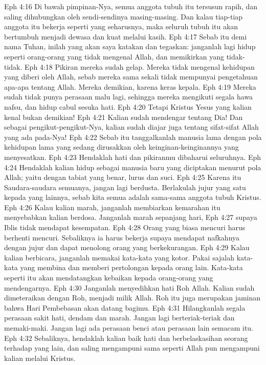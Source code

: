 Eph 4:16  Di bawah pimpinan-Nya, semua anggota tubuh itu tersusun rapih, dan saling dihubungkan oleh sendi-sendinya masing-masing. Dan kalau tiap-tiap anggota itu bekerja seperti yang seharusnya, maka seluruh tubuh itu akan bertumbuh menjadi dewasa dan kuat melalui kasih.
Eph 4:17  Sebab itu demi nama Tuhan, inilah yang akan saya katakan dan tegaskan: janganlah lagi hidup seperti orang-orang yang tidak mengenal Allah, dan memikirkan yang tidak-tidak.
Eph 4:18  Pikiran mereka sudah gelap. Mereka tidak mengenal kehidupan yang diberi oleh Allah, sebab mereka sama sekali tidak mempunyai pengetahuan apa-apa tentang Allah. Mereka demikian, karena keras kepala.
Eph 4:19  Mereka sudah tidak punya perasaan malu lagi, sehingga mereka mengikuti segala hawa nafsu, dan hidup cabul sesuka hati.
Eph 4:20  Tetapi Kristus Yesus yang kalian kenal bukan demikian!
Eph 4:21  Kalian sudah mendengar tentang Dia! Dan sebagai pengikut-pengikut-Nya, kalian sudah diajar juga tentang sifat-sifat Allah yang ada pada-Nya!
Eph 4:22  Sebab itu tanggalkanlah manusia lama dengan pola kehidupan lama yang sedang dirusakkan oleh keinginan-keinginannya yang menyesatkan.
Eph 4:23  Hendaklah hati dan pikiranmu dibaharui seluruhnya.
Eph 4:24  Hendaklah kalian hidup sebagai manusia baru yang diciptakan menurut pola Allah; yaitu dengan tabiat yang benar, lurus dan suci.
Eph 4:25  Karena itu Saudara-saudara semuanya, jangan lagi berdusta. Berlakulah jujur yang satu kepada yang lainnya, sebab kita semua adalah sama-sama anggota tubuh Kristus.
Eph 4:26  Kalau kalian marah, janganlah membiarkan kemarahan itu menyebabkan kalian berdosa. Janganlah marah sepanjang hari,
Eph 4:27  supaya Iblis tidak mendapat kesempatan.
Eph 4:28  Orang yang biasa mencuri harus berhenti mencuri. Sebaliknya ia harus bekerja supaya mendapat nafkahnya dengan jujur dan dapat menolong orang yang berkekurangan.
Eph 4:29  Kalau kalian berbicara, janganlah memakai kata-kata yang kotor. Pakai sajalah kata-kata yang membina dan memberi pertolongan kepada orang lain. Kata-kata seperti itu akan mendatangkan kebaikan kepada orang-orang yang mendengarnya.
Eph 4:30  Janganlah menyedihkan hati Roh Allah. Kalian sudah dimeteraikan dengan Roh, menjadi milik Allah. Roh itu juga merupakan jaminan bahwa Hari Pembebasan akan datang bagimu.
Eph 4:31  Hilangkanlah segala perasaan sakit hati, dendam dan marah. Jangan lagi berteriak-teriak dan memaki-maki. Jangan lagi ada perasaan benci atau perasaan lain semacam itu.
Eph 4:32  Sebaliknya, hendaklah kalian baik hati dan berbelaskasihan seorang terhadap yang lain, dan saling mengampuni sama seperti Allah pun mengampuni kalian melalui Kristus.
